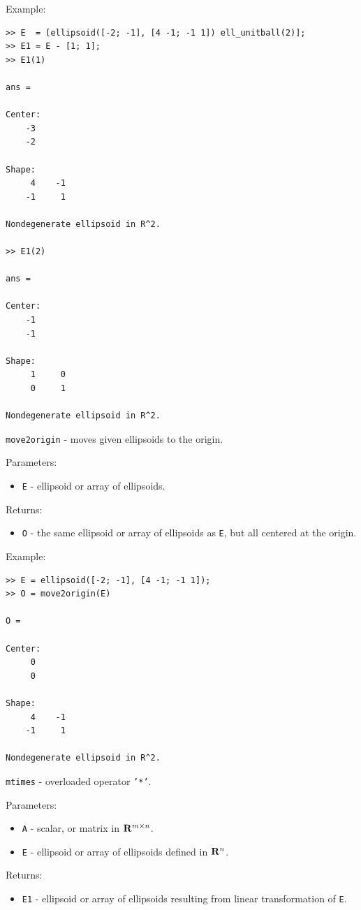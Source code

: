 \documentclass{report}
\begin{document}
Example:
{\tt \begin{verbatim}
>> E  = [ellipsoid([-2; -1], [4 -1; -1 1]) ell_unitball(2)];
>> E1 = E - [1; 1];
>> E1(1)

ans =

Center:
    -3
    -2

Shape:
     4    -1
    -1     1

Nondegenerate ellipsoid in R^2.

>> E1(2)

ans =

Center:
    -1
    -1

Shape:
     1     0
     0     1

Nondegenerate ellipsoid in R^2.
\end{verbatim} }

\newpage

{\Large {\tt move2origin}} - moves given ellipsoids to the origin.

Parameters:
\begin{itemize}
\item {\tt E} - ellipsoid or array of ellipsoids.
\end{itemize}

Returns:
\begin{itemize}
\item {\tt O} - the same ellipsoid or array of ellipsoids as {\tt E},
but all centered at the origin.
\end{itemize}

Example:
{\tt \begin{verbatim}
>> E = ellipsoid([-2; -1], [4 -1; -1 1]);
>> O = move2origin(E)

O =

Center:
     0
     0

Shape:
     4    -1
    -1     1

Nondegenerate ellipsoid in R^2.
\end{verbatim} }

\newpage

{\Large {\tt mtimes}} - overloaded operator {\tt '*'}.

Parameters:
\begin{itemize}
\item {\tt A} - scalar, or matrix in ${\bf R}^{m\times n}$.
\item {\tt E} - ellipsoid or array of ellipsoids defined in ${\bf R}^n$.
\end{itemize}

Returns:
\begin{itemize}
\item {\tt E1} - ellipsoid or array of ellipsoids resulting from linear
transformation of {\tt E}.
\end{itemize}
\end{document}
